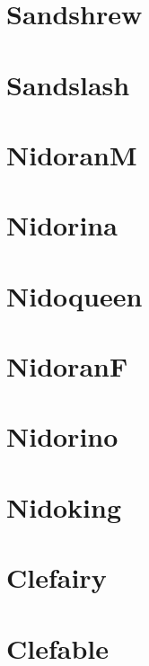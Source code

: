 \section{Sandshrew}
\label{exp:Sandshrew}
\section{Sandslash}
\label{exp:Sandslash}
\section{NidoranM}
\label{exp:NidoranM}
\section{Nidorina}
\label{exp:Nidorina}
\section{Nidoqueen}
\label{exp:Nidoqueen}
\section{NidoranF}
\label{exp:NidoranF}
\section{Nidorino}
\label{exp:Nidorino}
\section{Nidoking}
\label{exp:Nidoking}
\section{Clefairy}
\label{exp:Clefairy}
\section{Clefable}
\label{exp:Clefable}
